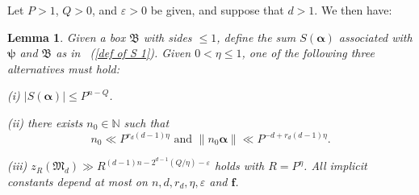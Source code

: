 \documentclass[12pt]{amsart}
\newtheorem{lem}[thm]{Lemma}
\theoremstyle{definition}
\theoremstyle{remark}
\numberwithin{equation}{section}
\begin{document}
Let $P > 1$, $Q > 0$, and $\varepsilon >0$ be given, and suppose that $d > 1$. We then have:
\begin{lem}\cite[Lemma 15.1]{S}
\label{Lemma 15.1 in S}
Given a box $\mathfrak{B}$ with sides $\leq 1$, define the sum  $S( \boldsymbol{\alpha})$ associated with $\boldsymbol{\psi}$ and $\mathfrak{B}$ as in ~(\ref{def of S 1}). Given $0 < \eta \leq 1$,
one of the following three alternatives must hold:

(i) $|  S( \boldsymbol{\alpha})  | \leq P^{n-Q}$.

(ii) there exists $n_0 \in \mathbb{N}$ such that
$$
n_0 \ll P^{r_d(d-1) \eta} \text{  and  } \|  n_0  \boldsymbol{\alpha} \| \ll P^{ -d + r_d (d-1) \eta}.
$$

(iii) $ z_{R} (\mathfrak{M}_d) \gg R^{ (d-1)n - 2^{d-1}(Q/ \eta) - \varepsilon}$
holds with $R = P^{\eta}$.
\newline
\newline
All implicit constants 
depend at most on
$n,d, r_d, \eta, \varepsilon$ and $\mathbf{f}$.
\end{lem}
\end{document}
